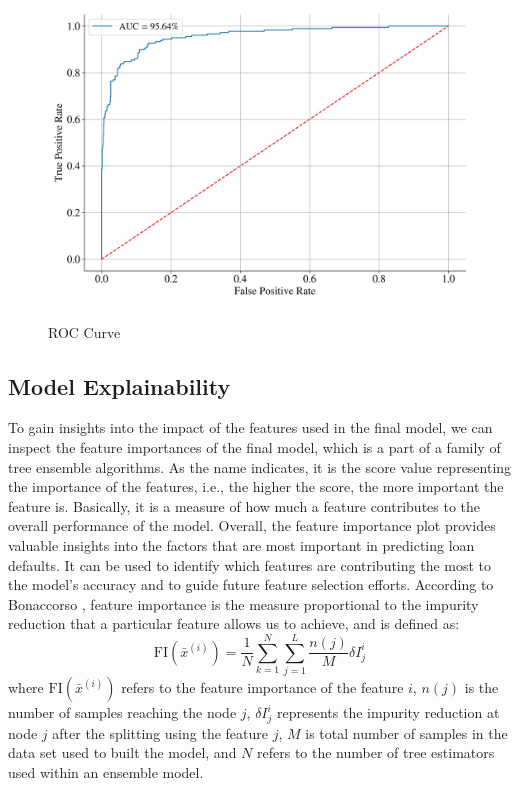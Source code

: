 \begin{figure}[H]
\centering
\caption{ROC Curve}\vspace{0.5em}
\label{fig:roc}\
\includegraphics[width=140mm]{Figures/ROC_curve_FINAL.jpg}

\vspace{-1em}
\end{figure}



\subsection{Model Explainability}
\label{subsec:explainability}

To gain insights into the impact of the features used in the final model, we can inspect the feature importances of the final model, which is a part of a family of tree ensemble algorithms.
As the name indicates, it is the score value representing the importance of the features, i.e., the higher the score, the more important the feature is. Basically, it is a measure of how much a feature contributes to the overall performance of the model.
Overall, the feature importance plot provides valuable insights into the factors that are most important in predicting loan defaults. It can be used to identify which features are contributing the most to the model's accuracy and to guide future feature selection efforts.
According to Bonaccorso \citep{bonaccorso2020mastering}, feature importance is the measure proportional to the impurity reduction that a particular feature allows us to achieve, and is defined as:
\begin{equation}\label{eq}
    \text{FI}\left(\bar{x}^{\left(i\right)}\right) = \frac{1}{N} \displaystyle\sum_{k=1}^{N} \displaystyle\sum_{j=1}^{L} \frac{n(j)}{M} \delta I_{j}^{i}
\end{equation}
where $ \text{FI}\left(\bar{x}^{\left(i\right)}\right)$ refers to the feature importance of the feature $i$, $n(j)$ is the number of samples reaching the node $j$, $\delta I_{j}^{i}$ represents the impurity reduction at node $j$ after the splitting using the feature $j$, $M$ is total number of samples in the data set used to built the model, and $N$ refers to the number of tree estimators used within an ensemble model.

